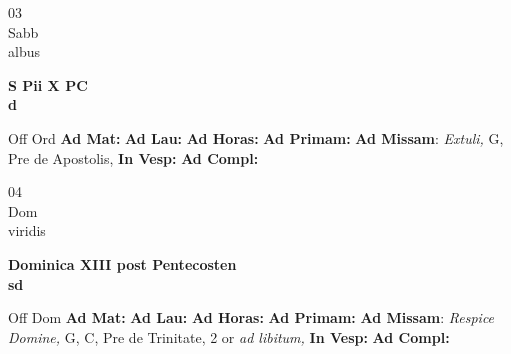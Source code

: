 \documentclass[10pt, openany]{book}
\begin{document}
    \begin{center}
        \begin{minipage}{3.5in}
            \vspace{2em}
            \begin{minipage}{0.5in}
                {\Huge 03} \\
                {\normalsize Sabb} \\
                {\normalsize albus}
            \end{minipage}
            \begin{minipage}{3.0in}
                \textbf{ \large S Pii X PC \\
                \textnormal{\normalsize d}} \\ 
            \end{minipage}
            \begin{justify}Off Ord
                \textbf{Ad Mat: }
                \textbf{Ad Lau: }
                \textbf{Ad Horas: }
                \textbf{Ad Primam: }\textbf{Ad Missam}: \textit{Extuli,} G, Pre de Apostolis,  
                \textbf{In Vesp: }
                \textbf{Ad Compl: }
            \end{justify}
        \end{minipage}
    \end{center}

    \begin{center}
        \begin{minipage}{3.5in}
            \vspace{2em}
            \begin{minipage}{0.5in}
                {\Huge 04} \\
                {\normalsize Dom} \\
                {\normalsize viridis}
            \end{minipage}
            \begin{minipage}{3.0in}
                \textbf{ \large Dominica XIII post Pentecosten \\
                \textnormal{\normalsize sd}} \\ 
            \end{minipage}
            \begin{justify}Off Dom
                \textbf{Ad Mat: }
                \textbf{Ad Lau: }
                \textbf{Ad Horas: }
                \textbf{Ad Primam: }\textbf{Ad Missam}: \textit{Respice Domine,} G, C, Pre de Trinitate, 2 or \textit{ad libitum,}  
                \textbf{In Vesp: }
                \textbf{Ad Compl: }
            \end{justify}
        \end{minipage}
    \end{center}
\end{document}
